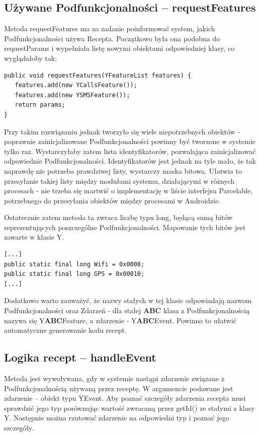 \documentclass[11pt,a4paper,polish,thesis]{dcsbook}
\begin{document}
\subsection{Używane Podfunkcjonalności -- requestFeatures}
Metoda requestFeatures ma za zadanie poinformować system, jakich Podfunkcjonalności używa Recepta. Początkowo była ona podobna do requestParams i wypełniała listę nowymi obiektami odpowiedniej klasy, co wyglądałoby tak:
\begin{verbatim}
public void requestFeatures(YFeatureList features) {
   features.add(new YCallsFeature());
   features.add(new YSMSFeature());
   return params;
}
\end{verbatim}
Przy takim rozwiązaniu jednak tworzyło się wiele niepotrzebnych obiektów - poprawnie zainicjalizowane Podfunkcjonalności powinny być tworzone w systemie tylko raz. Wystarczyłaby zatem lista identyfikatorów, pozwalająca zainicjalizować odpowiednie Podfunkcjonalności. Identyfikatorów jest jednak na tyle mało, że tak naprawdę nie potrzeba prawdziwej listy, wystarczy maska bitowa. Ułatwia to przesyłanie takiej listy między modułami systemu, działającymi w różnych procesach - nie trzeba się martwić o implementację w liście interfejsu Parcelable, potrzebnego do przesyłania obiektów między procesami w Androidzie.

Ostatecznie zatem metoda ta zwraca liczbę typu long, będącą sumą bitów reprezentujących poszczególne Podfunkcjonalności. Mapowanie tych bitów jest zawarte w klasie Y.
\begin{verbatim}
[...]
public static final long Wifi = 0x0008;
public static final long GPS = 0x00010;
[...]
\end{verbatim}
Dodatkowo warto zauważyć, że nazwy stałych w tej klasie odpowiadają nazwom Podfunkcjonalności oraz Zdarzeń - dla stałej {\bf ABC} klasa z Podfunkcjonalnością nazywa się Y{\bf ABC}Feature, a zdarzenie - Y{\bf ABC}Event. Powinno to ułatwić automatyczne generowanie kodu recept. 

\subsection{Logika recept -- handleEvent}
Metoda jest wywoływana, gdy w systemie nastąpi zdarzenie związane z Podfunkcjonalnością używaną przez receptę. W argumencie podawane jest zdarzenie -- obiekt typu YEvent. 
Aby poznać szczegóły zdarzenia recepta musi sprawdzić jego typ porównując wartość zwracaną przez getId() ze stałymi z klasy Y. Następnie można rzutować zdarzenie na odpowiedni typ i poznać jego szczegóły. 
\end{document}
